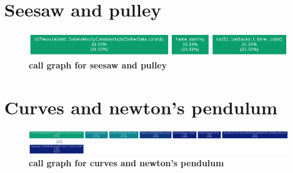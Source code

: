 \section{Seesaw and pulley}

\begin{figure}[H]
  \centering
    \includegraphics[scale=0.4]{project/images/seesaw.png}
  \caption{\textbf{call graph for seesaw and pulley}}
\end{figure}

\section{Curves and newton's pendulum}

\begin{figure}[H]
  \centering
    \includegraphics[scale=0.4]{project/images/curves.png}
  \caption{\textbf{call graph for curves and newton's pendulum}}
\end{figure}